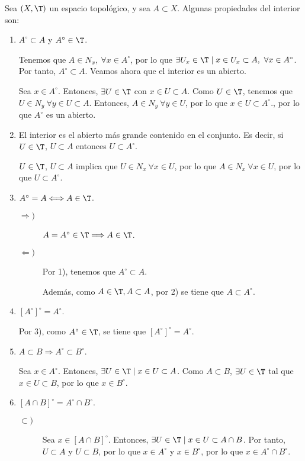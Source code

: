 Sea $(X,\T)$ un espacio topológico, y sea $A\subset X$. Algunas propiedades del interior son:
\begin{enumerate}
    \item $A^\circ \subset A$ y $A^\circ \in \T$.

    Tenemos que $A\in N_x,~\forall x\in A^\circ$, por lo que $\exists U_x\in \T\mid x\in U_x\subset A,~\forall x\in A^\circ$. Por tanto, $A^\circ \subset A$. Veamos ahora que el interior es un abierto.

    Sea $x\in A^\circ$. Entonces, $\exists U\in \T$ con $x\in U\subset A$. Como $U\in \T$, tenemos que $U\in N_y~\forall y\in U\subset A$. Entonces, $A\in N_y~\forall y\in U$, por lo que $x\in U\subset A^\circ.$, por lo que $A^\circ$ es un abierto.
    
    \item El interior es el abierto más grande contenido en el conjunto. Es decir, si $U\in \T$, $U\subset A$ entonces $U\subset A^\circ$.

    $U\in \T$, $U\subset A$ implica que $U\in N_x~\forall x\in U$, por lo que $A\in N_x~\forall x\in U$, por lo que $U\subset A^\circ$.
    
    \item $A^\circ = A\Longleftrightarrow A\in \T$.
    \begin{description}
        \item[$\Longrightarrow)$] $A=A^\circ \in \T\Longrightarrow A\in \T$.
        \item[$\Longleftarrow)$]  Por 1), tenemos que $A^\circ \subset A$.

        Además, como $A \in \T, A\subset A$, por 2) se tiene que $A\subset A^\circ$.
    \end{description}

    \item $[A^\circ]^\circ = A^\circ$.

    Por 3), como $A^\circ \in \T$, se tiene que $[A^\circ]^\circ = A^\circ$.
    
    \item $A\subset B\Longrightarrow A^\circ \subset B^\circ$.

    Sea $x\in A^\circ$. Entonces, $\exists U\in \T\mid x\in U\subset A$. Como $A\subset B$, $\exists U\in \T$ tal que $x\in U\subset B$, por lo que $x\in B^\circ$.
    
    \item $[A\cap B]^\circ = A^\circ \cap B^\circ$.

    \begin{description}
        \item[$\subset)$] Sea $x\in [A\cap B]^\circ$. Entonces, $\exists U\in \T\mid x\in U\subset A\cap B$. Por tanto, $U\subset A$ y $U\subset B$, por lo que $x\in A^\circ$ y $x\in B^\circ$, por lo que $x\in A^\circ \cap B^\circ$.


\end{description}
\end{enumerate}
